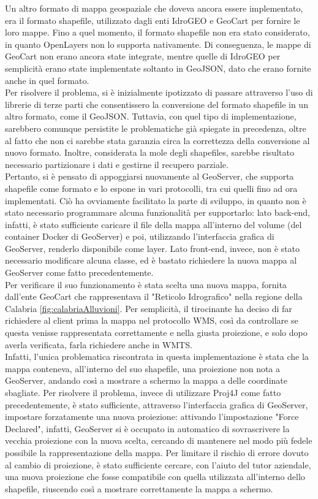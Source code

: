 Un altro formato di mappa geospaziale che doveva ancora essere implementato, era il formato shapefile, utilizzato dagli enti IdroGEO e GeoCart per fornire le loro mappe. Fino a quel momento, il formato shapefile non era stato considerato, in quanto OpenLayers non lo supporta nativamente. Di conseguenza, le mappe di GeoCart non erano ancora state integrate, mentre quelle di IdroGEO per semplicità erano state implementate soltanto in GeoJSON, dato che erano fornite anche in quel formato. 
\\Per risolvere il problema, si è inizialmente ipotizzato di passare attraverso l'uso di librerie di terze parti che consentissero la conversione del formato shapefile in un altro formato, come il GeoJSON. Tuttavia, con quel tipo di implementazione, sarebbero comunque persistite le problematiche già spiegate in precedenza, oltre al fatto che non ci sarebbe stata garanzia circa la correttezza della conversione al nuovo formato. Inoltre, considerata la mole degli shapefiles, sarebbe risultato necessario partizionare i dati e gestirne il recupero parziale.
\\Pertanto, si è pensato di appoggiarsi nuovamente al GeoServer, che supporta shapefile come formato e lo espone in vari protocolli, tra cui quelli fino ad ora implementati. Ciò ha ovviamente facilitato la parte di sviluppo, in quanto non è stato necessario programmare alcuna funzionalità per supportarlo: lato back-end, infatti, è stato sufficiente caricare il file della mappa all'interno del volume (del container Docker di GeoServer) e poi, utilizzando l'interfaccia grafica di GeoServer, renderlo disponibile come layer. Lato front-end, invece, non è stato necessario modificare alcuna classe, ed è bastato richiedere la nuova mappa al GeoServer come fatto precedentemente.
\\Per verificare il suo funzionamento è stata scelta una nuova mappa, fornita dall'ente GeoCart che rappresentava il "Reticolo Idrografico" nella regione della Calabria \ref{fig:calabriaAlluvioni}.
Per semplicità, il tirocinante ha deciso di far richiedere al client prima la mappa nel protocollo WMS, così da controllare se questa venisse rappresentata correttamente e nella giusta proiezione, e solo dopo averla verificata, farla richiedere anche in WMTS.
\\Infatti, l'unica problematica riscontrata in questa implementazione è stata che la mappa conteneva, all'interno del suo shapefile, una proiezione non nota a GeoServer, andando così a mostrare a schermo la mappa a delle coordinate sbagliate.
Per risolvere il problema, invece di utilizzare Proj4J come fatto precedentemente, è stato sufficiente, attraverso l'interfaccia grafica di GeoServer, impostare forzatamente una nuova proiezione: attivando l'impostazione "Force Declared", infatti, GeoServer si è occupato in automatico di sovrascrivere la vecchia proiezione con la nuova scelta, cercando di mantenere nel modo più fedele possibile la rappresentazione della mappa. Per limitare il rischio di errore dovuto al cambio di proiezione, è stato sufficiente cercare, con l'aiuto del tutor aziendale, una nuova proiezione che fosse compatibile con quella utilizzata all'interno dello shapefile, riuscendo così a mostrare correttamente la mappa a schermo. 
